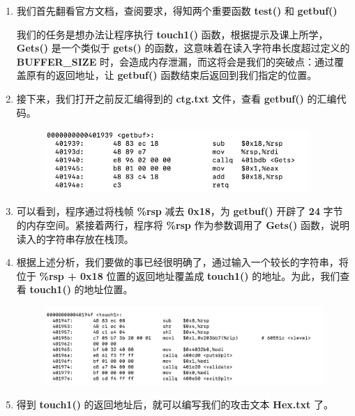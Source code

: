         \begin{enumerate}
            \item 我们首先翻看官方文档，查阅要求，得知两个重要函数 \textbf{test()} 和 \textbf{getbuf()}
                
                \par 我们的任务是想办法让程序执行 \textbf{touch1()} 函数，根据提示及课上所学，\textbf{Gets()} 是一个类似于 \textbf{gets()} 的函数，这意味着在读入字符串长度超过定义的 \textbf{BUFFER\_SIZE} 时，会造成内存泄漏，而这将会是我们的突破点：通过覆盖原有的返回地址，让 \textbf{getbuf()} 函数结束后返回到我们指定的位置。
            \item 接下来，我们打开之前反汇编得到的 \textbf{ctg.txt} 文件，查看 \textbf{getbuf()} 的汇编代码。
                \begin{figure}[htbp]
                    \hspace*{1.5cm}
                    \includegraphics*[width = 10cm]{s1_0.png}
                \end{figure}
            \item 可以看到，程序通过将栈帧 \textbf{\%rsp} 减去 \textbf{0x18}，为 \textbf{getbuf()} 开辟了 \textbf{24} 字节的内存空间。紧接着两行，程序将 \textbf{\%rsp} 作为参数调用了 \textbf{Gets()} 函数，说明读入的字符串存放在栈顶。
            \newpage
            \item 根据上述分析，我们要做的事已经很明确了，通过输入一个较长的字符串，将位于 \textbf{\%rsp + 0x18} 位置的返回地址覆盖成 \textbf{touch1()} 的地址。为此，我们查看 \textbf{touch1()} 的地址位置。
                \begin{figure}[htbp]
                    \hspace*{1.5cm}
                    \includegraphics*[width = 12cm]{s1_1.png}
                \end{figure}
            \item 得到 \textbf{touch1()} 的返回地址后，就可以编写我们的攻击文本 \textbf{Hex.txt} 了。

\end{enumerate}
